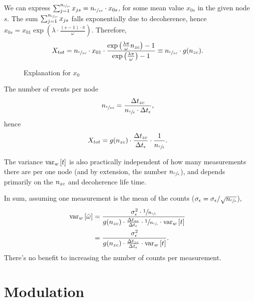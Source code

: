 \documentclass{article}
\begin{document}
We can express $\sum_{j=1}^{n_{\sfrac{\epsilon}{zc}}} x_{js} = n_{\sfrac{\epsilon}{zc}} \cdot x_{0s}$, for some mean value $x_{0s}$ in the given node $s$. The sum $\sum_{j=1}^{n_{\sfrac{\epsilon}{zc}}} x_{js}$ falls exponentially due to decoherence, hence $x_{0s} = x_{01}\exp{(\lambda\cdot \frac{(s-1)\cdot\pi}{\omega})}$. Therefore,
\[
	X_{tot} = \Nmnd\cdot x_{01} \cdot \frac{\exp{\bkt{\frac{\lambda\pi}{\omega}\Nnd}}-1}{\exp{\bkt{\frac{\lambda\pi}{\omega}}}-1} \equiv \Nmnd \cdot g(\Nnd).
\]

\begin{figure}[h]
	\centering
	\caption{Explanation for $x_0$\label{fig:x0Expl}}
\end{figure}

The number of events per node 
\[
	n_{\sfrac{\epsilon}{zc}} = \frac{\Delta t_{zc}}{n_{\sfrac{c}{\epsilon}}\cdot \Delta t_{\epsilon}},
\]
hence
\[
	X_{tot} = g(n_{zc}) \cdot \frac{\Delta t_{zc}}{\Delta t_{\epsilon}}\cdot \frac{1}{n_{\sfrac{c}{\epsilon}}}.
\]

The variance $\var[w]{t}$ is also practically independent of how many measurements there are per one node (and by extension, the number $n_{\sfrac{c}{\epsilon}}$), and depends primarily on the $n_{zc}$ and decoherence life time.

In sum, assuming one measurement is the mean of the counts ($\SD{\meas} = \SD{\meas}/\sqrt{\Ncm}$), 
\begin{align*}
	\var[w]{\hat{\omega}} &= \frac{\SD{\meas}^2\cdot \sfrac{1}{\Ncm}}{g(\Nnd)\cdot \frac{\Delta t_{zc}}{\Delta t_{\meas}}\cdot \sfrac{1}{\Ncm} \cdot \var[w]{t}} \\
		&= \frac{\SD{\meas}^2}{g(\Nnd)\cdot \frac{\Delta t_{zc}}{\Delta t_{\meas}} \cdot \var[w]{t}}.
\end{align*}
There's no benefit to increasing the number of counts per measurement.

\section{Modulation}
\end{document}
